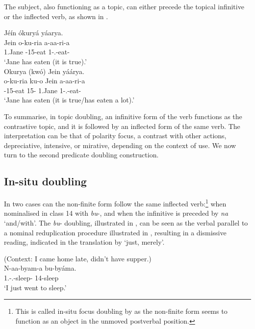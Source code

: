 \documentclass[output=paper]{langscibook}
\begin{document}
\z


The subject, also functioning as a topic, can either precede the topical infinitive or the inflected verb, as shown in . 

\ea
\label{bkm:Ref111465657}
\ea
Jéín ókuryá yáarya.\\
\gll
Jein  o-ku-ria  a-aa-ri-a\\
1.Jane  \AUG{}-15-eat  1\SM{}-\N{}.\PST{}-eat-\FV{}\\
\glt
‘Jane has eaten (it is true).’\\

\ex
Okurya (kwó) Jein yáárya.\\
\gll
o-ku-ria  ku-o  Jein  a-aa-ri-a\\
\AUG{}-15-eat  15-\CM{}  1.Jane  1\SM{}-\N{}.\PST{}-eat-\FV{}\\
\glt
‘Jane has eaten (it is true/has eaten a lot).’\\

\z
\z

To summarise, in topic doubling, an infinitive form of the verb functions as the contrastive topic, and it is followed by an inflected form of the same verb. The interpretation can be that of polarity focus, a contrast with other actions, depreciative, intensive, or mirative, depending on the context of use. We now turn to the second predicate doubling construction.

\subsection{In-situ doubling}

In two cases can the non-finite form follow the same inflected verb:\footnote{This is called in-situ focus doubling by \citet{GüldemannFiedler2022} as the non-finite form seems to function as an object in the unmoved postverbal position.} when nominalised in class 14 with \textit{bu}-, and when the infinitive is preceded by \textit{na} ‘and/with’. The \textit{bu}- doubling, illustrated in , can be seen as the verbal parallel to a nominal reduplication procedure illustrated in , resulting in a dismissive reading, indicated in the translation by ‘just, merely’.

\ea
\label{bkm:Ref98835711}
(Context: I came home late, didn’t have supper.)\\
\gll
N-aa-byam-a  bu-byáma.\\
1\SG{}.\SM{}-\N{}.\PST{}-sleep-\FV{}  14-sleep\\
\glt
‘I just went to sleep.’\\
\end{document}
